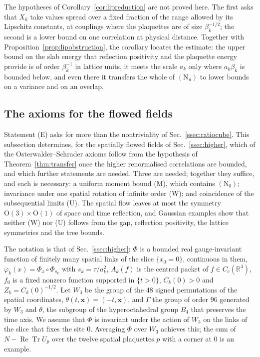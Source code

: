 \documentclass[aps,prd,twocolumn,superscriptaddress,nofootinbib,longbibliography,floatfix,amsmath,amssymb,10pt]{revtex4-2}
\theoremstyle{definition}
\theoremstyle{remark}
\newcommand{\R}{\mathbb{R}}
\newcommand{\ReTr}{\operatorname{Re}\operatorname{Tr}}
\begin{document}
The hypotheses of Corollary~\ref{cor:lipreduction} are not proved here. The
first asks that $X_k$ take values spread over a fixed fraction of the range
allowed by its Lipschitz constants, at couplings where the plaquettes are of
size $\beta_k^{-1/2}$; the second is a lower bound on one correlation at
physical distance. Together with Proposition~\ref{prop:lipobstruction}, the
corollary locates the estimate: the upper bound on the slab energy that
reflection positivity and the plaquette energy provide is of order
$\beta_k^{-1}$ in lattice units, it meets the scale $a_k$ only where
$a_k\beta_k$ is bounded below, and even there it transfers the whole of
$(\mathrm N_u)$ to lower bounds on a variance and on an overlap.

\subsection{The axioms for the flowed fields}\label{ssec:osaxioms}

Statement (E) asks for more than the nontriviality of
Sec.~\ref{ssec:ratiocube}. This subsection determines, for the spatially
flowed fields of Sec.~\ref{ssec:higher}, which of the Osterwalder--Schrader
axioms follow from the hypothesis of Theorem~\ref{thm:transfer} once the
higher renormalised correlations are bounded, and which further statements
are needed. Three are needed; together they suffice, and each is necessary:
a uniform moment bound (M), which contains $(\mathrm N_0)$; invariance under
one spatial rotation of infinite order (W); and coincidence of the
subsequential limits (U). The spatial flow leaves at most the symmetry
$\mathrm O(3)\times\mathrm O(1)$ of space and time reflection, and Gaussian
examples show that neither (W) nor (U) follows from the gap, reflection
positivity, the lattice symmetries and the tree bounds.

The notation is that of Sec.~\ref{ssec:higher}: $\Phi$ is a bounded real
gauge-invariant function of finitely many spatial links of the slice
$\{x_0=0\}$, continuous in them, $\varphi_k(x)=\Phi_x\circ\Phi_{s_k}$ with
$s_k=\tau/a_k^2$, $A_k(f)$ is the centred packet of $f\in C_c(\R^4)$, $f_0$ is
a fixed nonzero function supported in $\{t>0\}$, $C_k(0)>0$ and
$Z_k=C_k(0)^{-1/2}$. Let $W_3$ be the group of the $48$ signed permutations of
the spatial coordinates, $\theta(t,\mathbf x)=(-t,\mathbf x)$, and $\Gamma$ the
group of order $96$ generated by $W_3$ and $\theta$, the subgroup of the
hyperoctahedral group $B_4$ that preserves the time axis. We assume that
$\Phi$ is invariant under the action of $W_3$ on the links of the slice that
fixes the site $0$. Averaging $\Phi$ over $W_3$ achieves this; the sum of
$N-\ReTr U_p$ over the twelve spatial plaquettes $p$ with a corner at $0$ is
an example.
\end{document}
